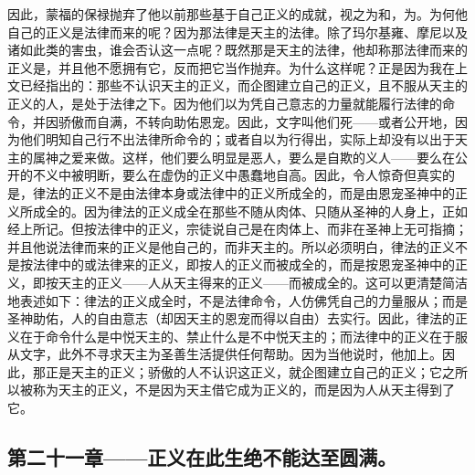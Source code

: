 因此，蒙福的保禄抛弃了他以前那些基于自己正义的成就，视之为和，为。为何他自己的正义是法律而来的呢？因为那法律是天主的法律。除了玛尔基雍、摩尼以及诸如此类的害虫，谁会否认这一点呢？既然那是天主的法律，他却称那法律而来的正义是，并且他不愿拥有它，反而把它当作抛弃。为什么这样呢？正是因为我在上文已经指出的：那些不认识天主的正义，而企图建立自己的正义，且不服从天主的正义的人，是处于法律之下。因为他们以为凭自己意志的力量就能履行法律的命令，并因骄傲而自满，不转向助佑恩宠。因此，文字叫他们死——或者公开地，因为他们明知自己行不出法律所命令的；或者自以为行得出，实际上却没有以出于天主的属神之爱来做。这样，他们要么明显是恶人，要么是自欺的义人——要么在公开的不义中被明断，要么在虚伪的正义中愚蠢地自高。因此，令人惊奇但真实的是，律法的正义不是由法律本身或法律中的正义所成全的，而是由恩宠圣神中的正义所成全的。因为律法的正义成全在那些不随从肉体、只随从圣神的人身上，正如经上所记。但按法律中的正义，宗徒说自己是在肉体上、而非在圣神上无可指摘；并且他说法律而来的正义是他自己的，而非天主的。所以必须明白，律法的正义不是按法律中的或法律来的正义，即按人的正义而被成全的，而是按恩宠圣神中的正义，即按天主的正义——人从天主得来的正义——而被成全的。这可以更清楚简洁地表述如下：律法的正义成全时，不是法律命令，人仿佛凭自己的力量服从；而是圣神助佑，人的自由意志（却因天主的恩宠而得以自由）去实行。因此，律法的正义在于命令什么是中悦天主的、禁止什么是不中悦天主的；而法律中的正义在于服从文字，此外不寻求天主为圣善生活提供任何帮助。因为当他说时，他加上。因此，那正是天主的正义；骄傲的人不认识这正义，就企图建立自己的正义；它之所以被称为天主的正义，不是因为天主借它成为正义的，而是因为人从天主得到了它。\par


\subsection{第二十一章——正义在此生绝不能达至圆满。}

